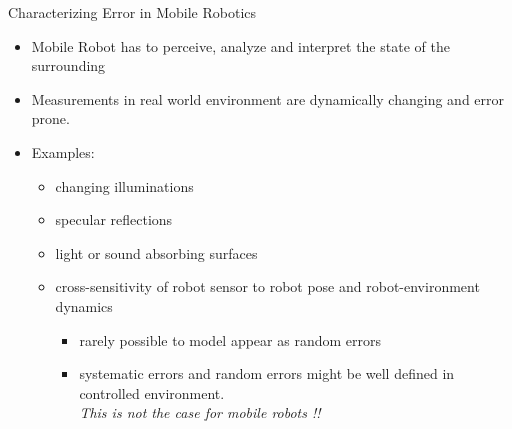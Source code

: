 \documentclass[compress]{beamer}
\begin{document}
\begin{frame}{Characterizing Error in Mobile Robotics}
    \begin{itemize}
        \item Mobile Robot has to perceive, analyze and interpret the state of the
              surrounding

        \item Measurements in real world environment are dynamically changing and
              error prone.

        \item Examples:

              \begin{itemize}
                  \item  changing illuminations

                  \item specular reflections

                  \item light or sound absorbing surfaces

                  \item cross-sensitivity of robot sensor to robot pose and robot-environment
                        dynamics

                        \begin{itemize}

                            \item
                                  rarely possible to model \rightarrow appear as random errors
                            \item
                                  systematic errors and random errors might be well defined in
                                  controlled environment.\\\emph{This is not the case for mobile robots
                                  !!}
                        \end{itemize}

              \end{itemize}
    \end{itemize}
\end{frame}
\end{document}
